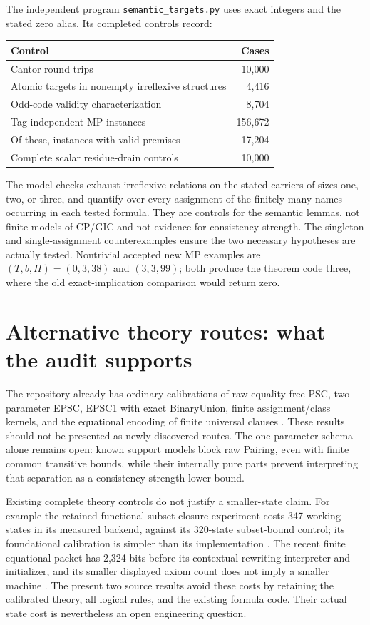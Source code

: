 \documentclass[11pt]{article}
\begin{document}
The independent program \texttt{semantic\_targets.py} uses exact integers and
the stated zero alias. Its completed controls record:
\begin{center}
\begin{tabular}{lr}
\toprule
Control&Cases\\
\midrule
Cantor round trips&10,000\\
Atomic targets in nonempty irreflexive structures&4,416\\
Odd-code validity characterization&8,704\\
Tag-independent MP instances&156,672\\
Of these, instances with valid premises&17,204\\
Complete scalar residue-drain controls&10,000\\
\bottomrule
\end{tabular}
\end{center}
The model checks exhaust irreflexive relations on the stated carriers of sizes
one, two, or three, and quantify over every assignment of the finitely many
names occurring in each tested formula. They are controls for the semantic
lemmas, not finite models of CP/GIC and not evidence for consistency strength.
The singleton and single-assignment counterexamples ensure the two necessary
hypotheses are actually tested. Nontrivial accepted new MP examples are
\((T,b,H)=(0,3,38)\) and \((3,3,99)\); both produce the theorem code three,
where the old exact-implication comparison would return zero.

\section{Alternative theory routes: what the audit supports}

The repository already has ordinary calibrations of raw equality-free PSC,
two-parameter EPSC, EPSC1 with exact BinaryUnion, finite assignment/class
kernels, and the equational encoding of finite universal clauses
\cite{raw,unary,equational}. These results should not be presented as newly
discovered routes. The one-parameter schema alone remains open: known support
models block raw Pairing, even with finite common transitive bounds, while
their internally pure parts prevent interpreting that separation as a
consistency-strength lower bound.

Existing complete theory controls do not justify a smaller-state claim. For
example the retained functional subset-closure experiment costs 347 working
states in its measured backend, against its 320-state subset-bound control;
its foundational calibration is simpler than its implementation
\cite{functional}. The recent finite equational packet has 2,324 bits before
its contextual-rewriting interpreter and initializer, and its smaller displayed
axiom count does not imply a smaller machine \cite{equational}.
The present two source results avoid these costs by retaining the calibrated
theory, all logical rules, and the existing formula code. Their actual state
cost is nevertheless an open engineering question.
\end{document}
